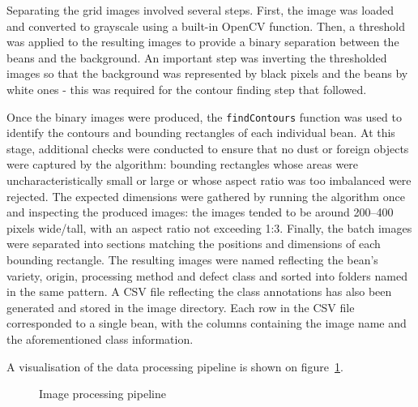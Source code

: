 Separating the grid images involved several steps.
First, the image was loaded and converted to grayscale using a built-in OpenCV function.
Then, a threshold was applied to the resulting images to provide a binary separation between the beans and the background.
An important step was inverting the thresholded images so that the background was represented by black pixels
and the beans by white ones - this was required for the contour finding step that followed.

Once the binary images were produced, the \verb |findContours| function was used to identify the contours and
bounding rectangles of each individual bean.
At this stage, additional checks were conducted to ensure that no dust or foreign objects were captured by the algorithm:
bounding rectangles whose areas were uncharacteristically small or large or whose aspect ratio was too imbalanced were rejected.
The expected dimensions were gathered by running the algorithm once and inspecting the produced images: the images tended
to be around 200--400 pixels wide/tall, with an aspect ratio not exceeding 1:3.
Finally, the batch images were separated into sections matching the positions and dimensions of each bounding rectangle.
The resulting images were named reflecting the bean's variety, origin, processing method and defect class and sorted into folders
named in the same pattern.
A CSV file reflecting the class annotations has also been generated and stored in the image directory.
Each row in the CSV file corresponded to a single bean, with the columns containing the image name and the
aforementioned class information.

A visualisation of the data processing pipeline is shown on figure~\ref{fig:imgProcessing}.
\pagebreak
\begin{figure}[h]
	\centering
{}
	\caption{Image processing pipeline}
	\label{fig:imgProcessing}
\end{figure}

